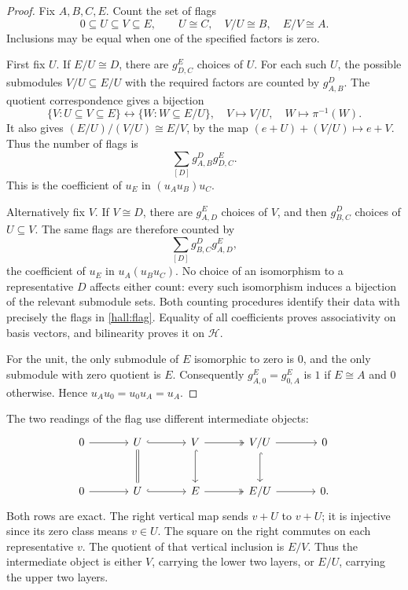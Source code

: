 \documentclass[11pt]{article}
\theoremstyle{definition}
\theoremstyle{remark}\newtheorem{remark}[theorem]{Remark}
\begin{document}
\begin{proof}
Fix $A,B,C,E$. Count the set of flags
\begin{equation}\label{hall:flag}
0\subseteq U\subseteq V\subseteq E,
\qquad U\cong C,\quad V/U\cong B,\quad E/V\cong A.
\end{equation}
Inclusions may be equal when one of the specified factors is zero.

First fix $U$. If $E/U\cong D$, there are $g_{D,C}^{E}$ choices of $U$.
For each such $U$, the possible submodules $V/U\subseteq E/U$ with
the required factors are counted by $g_{A,B}^{D}$. The quotient
correspondence gives a bijection
\[
\{V:U\subseteq V\subseteq E\}
\longleftrightarrow
\{W:W\subseteq E/U\},
\quad V\longmapsto V/U,\quad W\longmapsto\pi^{-1}(W).
\]
It also gives $(E/U)/(V/U)\cong E/V$, by the map
$(e+U)+(V/U)\mapsto e+V$. Thus the number of flags is
\[
\sum_{[D]}g_{A,B}^{D}g_{D,C}^{E}.
\]
This is the coefficient of $u_E$ in $(u_Au_B)u_C$.

Alternatively fix $V$. If $V\cong D$, there are $g_{A,D}^{E}$ choices
of $V$, and then $g_{B,C}^{D}$ choices of $U\subseteq V$.
The same flags are therefore counted by
\[
\sum_{[D]}g_{B,C}^{D}g_{A,D}^{E},
\]
the coefficient of $u_E$ in $u_A(u_Bu_C)$. No choice of an isomorphism
to a representative $D$ affects either count: every such isomorphism
induces a bijection of the relevant submodule sets. Both counting
procedures identify their data with precisely the flags in
\eqref{hall:flag}. Equality of all coefficients proves associativity on
basis vectors, and bilinearity proves it on $\mathcal H$.

For the unit, the only submodule of $E$ isomorphic to zero is $0$,
and the only submodule with zero quotient is $E$. Consequently
$g_{A,0}^{E}=g_{0,A}^{E}$ is $1$ if $E\cong A$ and $0$ otherwise.
Hence $u_Au_0=u_0u_A=u_A$.
\end{proof}

The two readings of the flag use different intermediate objects:
\[
\begin{tikzcd}[column sep=large,row sep=large]
0\arrow[r]&U\arrow[r,hook]\arrow[d,equal]&V\arrow[r,two heads]\arrow[d,hook]
  &V/U\arrow[r]\arrow[d,hook]&0\\
0\arrow[r]&U\arrow[r,hook]&E\arrow[r,two heads]&E/U\arrow[r]&0.
\end{tikzcd}
\]
Both rows are exact. The right vertical map sends $v+U$ to $v+U$;
it is injective since its zero class means $v\in U$. The square on the
right commutes on each representative $v$. The quotient of that vertical
inclusion is $E/V$. Thus the intermediate object is either $V$, carrying
the lower two layers, or $E/U$, carrying the upper two layers.
\end{document}
